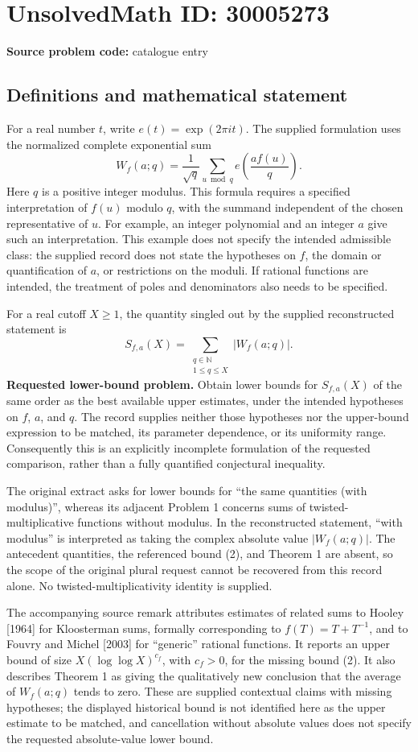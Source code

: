 \documentclass[11pt]{article}
\newcommand{\N}{\mathbb{N}}
\begin{document}
\section*{UnsolvedMath ID: 30005273}
\textbf{Source problem code:} catalogue entry
\subsection{Definitions and mathematical statement}
For a real number \(t\), write \(e(t)=\exp(2\pi i t)\). The supplied formulation uses the normalized complete exponential sum
\[
W_f(a;q)=\frac{1}{\sqrt q}\sum_{u\bmod q}e\!\left(\frac{a f(u)}q\right).
\]
Here \(q\) is a positive integer modulus. This formula requires a specified interpretation of \(f(u)\) modulo \(q\), with the summand independent of the chosen representative of \(u\). For example, an integer polynomial and an integer \(a\) give such an interpretation. This example does not specify the intended admissible class: the supplied record does not state the hypotheses on \(f\), the domain or quantification of \(a\), or restrictions on the moduli. If rational functions are intended, the treatment of poles and denominators also needs to be specified.

For a real cutoff \(X\geq1\), the quantity singled out by the supplied reconstructed statement is
\[
S_{f,a}(X)=\sum_{\substack{q\in\N\\1\leq q\leq X}}|W_f(a;q)|.
\]
\textbf{Requested lower-bound problem.} Obtain lower bounds for \(S_{f,a}(X)\) of the same order as the best available upper estimates, under the intended hypotheses on \(f\), \(a\), and \(q\). The record supplies neither those hypotheses nor the upper-bound expression to be matched, its parameter dependence, or its uniformity range. Consequently this is an explicitly incomplete formulation of the requested comparison, rather than a fully quantified conjectural inequality.

The original extract asks for lower bounds for ``the same quantities (with modulus)'', whereas its adjacent Problem 1 concerns sums of twisted-multiplicative functions without modulus. In the reconstructed statement, ``with modulus'' is interpreted as taking the complex absolute value \(|W_f(a;q)|\). The antecedent quantities, the referenced bound (2), and Theorem 1 are absent, so the scope of the original plural request cannot be recovered from this record alone. No twisted-multiplicativity identity is supplied.

The accompanying source remark attributes estimates of related sums to Hooley [1964] for Kloosterman sums, formally corresponding to \(f(T)=T+T^{-1}\), and to Fouvry and Michel [2003] for ``generic'' rational functions. It reports an upper bound of size \(X(\log\log X)^{c_f}\), with \(c_f>0\), for the missing bound (2). It also describes Theorem 1 as giving the qualitatively new conclusion that the average of \(W_f(a;q)\) tends to zero. These are supplied contextual claims with missing hypotheses; the displayed historical bound is not identified here as the upper estimate to be matched, and cancellation without absolute values does not specify the requested absolute-value lower bound.
\end{document}
